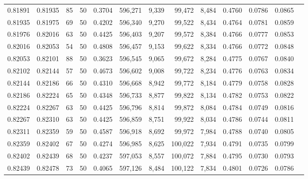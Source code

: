 \begin{tabular}{rrrrrrrrrrrrr}
0.81891 & 0.81935 &    85 &  50 &                                     0.3704 & 596,271 &   9,339 &  99,472 &   8,484 & 0.4760 & 0.0786 & 0.0865 \\
0.81935 & 0.81975 &    69 &  50 &                                     0.4202 & 596,340 &   9,270 &  99,522 &   8,434 & 0.4764 & 0.0781 & 0.0859 \\
0.81976 & 0.82016 &    63 &  50 &                                     0.4425 & 596,403 &   9,207 &  99,572 &   8,384 & 0.4766 & 0.0777 & 0.0853 \\
0.82016 & 0.82053 &    54 &  50 &                                     0.4808 & 596,457 &   9,153 &  99,622 &   8,334 & 0.4766 & 0.0772 & 0.0848 \\
0.82053 & 0.82101 &    88 &  50 &                                     0.3623 & 596,545 &   9,065 &  99,672 &   8,284 & 0.4775 & 0.0767 & 0.0840 \\
0.82102 & 0.82144 &    57 &  50 &                                     0.4673 & 596,602 &   9,008 &  99,722 &   8,234 & 0.4776 & 0.0763 & 0.0834 \\
0.82144 & 0.82186 &    66 &  50 &                                     0.4310 & 596,668 &   8,942 &  99,772 &   8,184 & 0.4779 & 0.0758 & 0.0828 \\
0.82186 & 0.82224 &    65 &  50 &                                     0.4348 & 596,733 &   8,877 &  99,822 &   8,134 & 0.4782 & 0.0753 & 0.0822 \\
0.82224 & 0.82267 &    63 &  50 &                                     0.4425 & 596,796 &   8,814 &  99,872 &   8,084 & 0.4784 & 0.0749 & 0.0816 \\
0.82267 & 0.82310 &    63 &  50 &                                     0.4425 & 596,859 &   8,751 &  99,922 &   8,034 & 0.4786 & 0.0744 & 0.0811 \\
0.82311 & 0.82359 &    59 &  50 &                                     0.4587 & 596,918 &   8,692 &  99,972 &   7,984 & 0.4788 & 0.0740 & 0.0805 \\
0.82359 & 0.82402 &    67 &  50 &                                     0.4274 & 596,985 &   8,625 & 100,022 &   7,934 & 0.4791 & 0.0735 & 0.0799 \\
0.82402 & 0.82439 &    68 &  50 &                                     0.4237 & 597,053 &   8,557 & 100,072 &   7,884 & 0.4795 & 0.0730 & 0.0793 \\
0.82439 & 0.82478 &    73 &  50 &                                     0.4065 & 597,126 &   8,484 & 100,122 &   7,834 & 0.4801 & 0.0726 & 0.0786 \\

\end{tabular}
